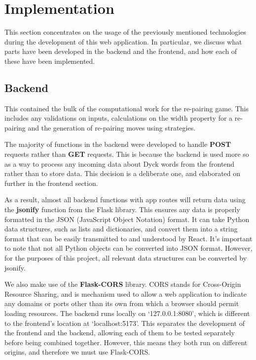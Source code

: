\section{Implementation}
This section concentrates on the usage of the previously mentioned technologies during the development of this web application. In particular, we discuss what parts have been developed in the backend and the frontend, and how each of these have been implemented.

\subsection{Backend}
This contained the bulk of the computational work for the re-pairing game. This includes any validations on inputs, calculations on the width property for a re-pairing and the generation of re-pairing moves using strategies.

The majority of functions in the backend were developed to handle \textbf{POST} requests rather than \textbf{GET} requests. This is because the backend is used more so as a way to process any incoming data about Dyck words from the frontend rather than to store data. This decision is a deliberate one, and elaborated on further in the frontend section.

As a result, almost all backend functions with app routes will return data using the \textbf{jsonify} function from the Flask library. This ensures any data is properly formatted in the JSON (JavaScript Object Notation) format. It can take Python data structures, such as lists and dictionaries, and convert them into a string format that can be easily transmitted to and understood by React. It's important to note that not all Python objects can be converted into JSON format. However, for the purposes of this project, all relevant data structures can be converted by jsonify.

We also make use of the \textbf{Flask-CORS} library. CORS stands for Cross-Origin Resource Sharing, and is mechanism used to allow a web application to indicate any domains or ports other than its own from which a browser should permit loading resources\cite{}. The backend runs locally on {`127.0.0.1:8080'}, which is different to the frontend's location at {`localhost:5173'}. This separates the development of the frontend and the backend, allowing each of them to be tested separately before being combined together. However, this means they both run on different origins, and therefore we must use Flask-CORS. 

